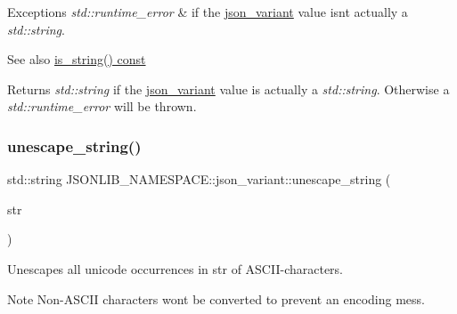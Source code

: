 \begin{DoxyExceptions}{Exceptions}
{\em std\+::runtime\+\_\+error} & if the \hyperlink{classJSONLIB__NAMESPACE_1_1json__variant}{json\+\_\+variant} value isn\textquotesingle{}t actually a {\itshape std\+::string}. \\
\hline
\end{DoxyExceptions}
\begin{DoxySeeAlso}{See also}
\hyperlink{classJSONLIB__NAMESPACE_1_1json__variant_ae097a22fe419dd083ff07bfebf0e8151}{is\+\_\+string() const} 
\end{DoxySeeAlso}
\begin{DoxyReturn}{Returns}
{\itshape std\+::string} if the \hyperlink{classJSONLIB__NAMESPACE_1_1json__variant}{json\+\_\+variant} value is actually a {\itshape std\+::string}. Otherwise a {\itshape std\+::runtime\+\_\+error} will be thrown. 
\end{DoxyReturn}
\mbox{\label{classJSONLIB__NAMESPACE_1_1json__variant_ab3b411443074a97949b5675676d0b136}} 
\subsubsection{\texorpdfstring{unescape\+\_\+string()}{unescape\_string()}}
{\footnotesize\ttfamily std\+::string J\+S\+O\+N\+L\+I\+B\+\_\+\+N\+A\+M\+E\+S\+P\+A\+C\+E\+::json\+\_\+variant\+::unescape\+\_\+string (\begin{DoxyParamCaption}\item[{std\+::string}]{str }\end{DoxyParamCaption})\hspace{0.3cm}{\ttfamily [static]}}



Unescapes all unicode occurrences in {\ttfamily str} of A\+S\+C\+I\+I-\/characters. 

\begin{DoxyNote}{Note}
Non-\/\+A\+S\+C\+II characters won\textquotesingle{}t be converted to prevent an encoding mess. 
\end{DoxyNote}

